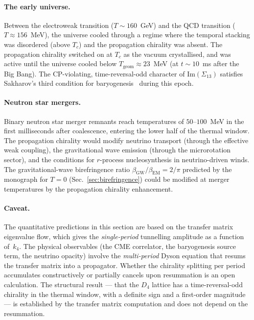 \paragraph{The early universe.}  Between the electroweak transition ($T \sim 160$~GeV) and the QCD transition ($T \approx 156$~MeV), the universe cooled through a regime where the temporal stacking was disordered (above $T_c$) and the propagation chirality was absent.  The propagation chirality switched on at $T_c$ as the vacuum crystallised, and was active until the universe cooled below $T_{\text{geom}} \approx 23$~MeV (at $t \sim 10$~ms after the Big Bang).  The CP-violating, time-reversal-odd character of $\text{Im}(\Sigma_{13})$ satisfies Sakharov's third condition for baryogenesis~\cite{Sakharov1967} during this epoch.

\paragraph{Neutron star mergers.}  Binary neutron star merger remnants reach temperatures of $50$--$100$~MeV in the first milliseconds after coalescence, entering the lower half of the thermal window.  The propagation chirality would modify neutrino transport (through the effective weak coupling), the gravitational wave emission (through the microrotation sector), and the conditions for $r$-process nucleosynthesis in neutrino-driven winds.  The gravitational-wave birefringence ratio $\beta_{\text{GW}}/\beta_{\text{EM}} = 2/\pi$ predicted by the monograph for $T = 0$ (Sec.~\ref{sec:birefringence}) could be modified at merger temperatures by the propagation chirality enhancement.

\paragraph{Caveat.}  The quantitative predictions in this section are based on the transfer matrix eigenvalue flow, which gives the \textit{single-period} tunnelling amplitude as a function of~$k_4$.  The physical observables (the CME correlator, the baryogenesis source term, the neutrino opacity) involve the \textit{multi-period} Dyson equation that resums the transfer matrix into a propagator.  Whether the chirality splitting per period accumulates constructively or partially cancels upon resummation is an open calculation.  The structural result --- that the $D_4$ lattice has a time-reversal-odd chirality in the thermal window, with a definite sign and a first-order magnitude --- is established by the transfer matrix computation and does not depend on the resummation.
